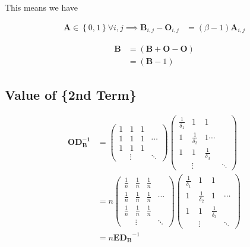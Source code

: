 \documentclass[11pt]{article}
\begin{document}
This means we have


\begin{align*}
\mathbf{A} \in \left\{0, 1\right\} \forall i,j  \implies   \mathbf{B}_{i,j}- \mathbf{O}_{i,j} &= \left( \beta-1 \right) \mathbf{A}_{i,j}
\end{align*}



\begin{align*}
\mathbf{B}&= \left( \mathbf{B}+  \mathbf{O}- \mathbf{O} \right) \\
&= \left( \mathbf{B}- 1 \right)
\end{align*}

\subsection{Value of \{2nd Term\}}
\label{value-of-2nd-term}
\begin{align*}
\mathbf{O} \mathbf{D_B^{- 1}} &=
\begin{pmatrix}
    1 & 1      & 1 &        \\
    1 & 1      & 1 &\cdots  \\
    1 & 1      & 1 &        \\
      & \vdots &   &\ddots
\end{pmatrix}
\begin{pmatrix}
    \frac{1}{\delta_1} & 1                    & 1                   & \\
    1                  & \frac{1}{\delta_{2}} & 1 \cdots            & \\
    1                  & 1                    &  \frac{1}{\delta_3} & \\
               & \vdots &             &                     \ddots
\end{pmatrix}
\\
&= n
\begin{pmatrix}
    \frac{1}{n} & \frac{1}{n}      & \frac{1}{n} &        \\
    \frac{1}{n} & \frac{1}{n}      & \frac{1}{n} &\cdots  \\
    \frac{1}{n} & \frac{1}{n}      & \frac{1}{n} &        \\
      & \vdots &   &\ddots
\end{pmatrix}
\begin{pmatrix}
    \frac{1}{\delta_1} & 1                    & 1                   &        \\
    1                  & \frac{1}{\delta_2}    & 1                   & \cdots \\
    1                  & 1                    &  \frac{1}{\delta_3} &        \\
                       & \vdots               &                     & \ddots
\end{pmatrix}
\\
&= n \mathbf{E}\mathbf{D_B}^{-1}
\end{align*}
\end{document}
